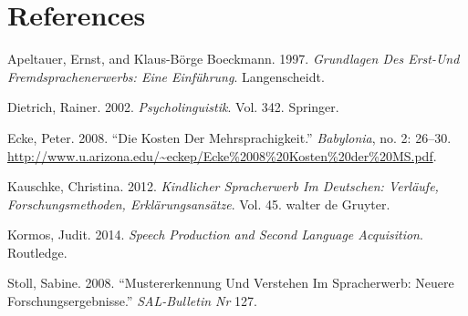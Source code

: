 \documentclass[
  letterpaper,
]{scrbook}
\newlength{\cslhangindent}
\newlength{\cslentryspacingunit} %
\newenvironment{CSLReferences}[2] %
 {%
  \setlength{\parindent}{0pt}
  \ifodd #1
  \let\oldpar\par
  \def\par{\hangindent=\cslhangindent\oldpar}
  \fi
  \setlength{\parskip}{#2\cslentryspacingunit}
 }%
 {}
\begin{document}

\hypertarget{references}{%
\chapter*{References}\label{references}}


\hypertarget{refs}{}
\begin{CSLReferences}{1}{0}
\leavevmode{}%
Apeltauer, Ernst, and Klaus-Börge Boeckmann. 1997. \emph{Grundlagen Des
Erst-Und Fremdsprachenerwerbs: Eine Einf{ü}hrung}. Langenscheidt.

\leavevmode{}%
Dietrich, Rainer. 2002. \emph{Psycholinguistik}. Vol. 342. Springer.

\leavevmode{}%
Ecke, Peter. 2008. {``Die Kosten Der Mehrsprachigkeit.''}
\emph{Babylonia}, no. 2: 26--30.
\url{http://www.u.arizona.edu/~eckep/Ecke\%2008\%20Kosten\%20der\%20MS.pdf}.

\leavevmode{}%
Kauschke, Christina. 2012. \emph{Kindlicher Spracherwerb Im Deutschen:
Verl{ä}ufe, Forschungsmethoden, Erkl{ä}rungsans{ä}tze}. Vol. 45. walter
de Gruyter.

\leavevmode{}%
Kormos, Judit. 2014. \emph{Speech Production and Second Language
Acquisition}. Routledge.

\leavevmode{}%
Stoll, Sabine. 2008. {``Mustererkennung Und Verstehen Im Spracherwerb:
Neuere Forschungsergebnisse.''} \emph{SAL-Bulletin Nr} 127.

\end{CSLReferences}


\backmatter

\printindex
\end{document}

